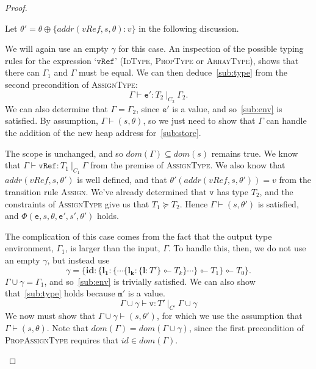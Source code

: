 \documentclass[12pt,a4paper,twoside,openright]{report}
\theoremstyle{definition}
\theoremstyle{dotless}
\newcommand*{\orig}{\ensuremath{\!\multimapinv\!}}
\begin{document}
\begin{proof}
\begin{case}[Assign]
	Let $\theta'=\theta\oplus\{addr(vRef,s,\theta):v\}$ in the following discussion.

	\begin{subcase}[AssignType]
	  We will again use an empty $\gamma$ for this case.
	  An inspection of the possible typing rules for the expression `$\mathtt{vRef}$'
	  (\textsc{IdType, PropType} or \textsc{ArrayType}), shows that there can
	  $\Gamma_1$ and $\Gamma$ must be equal.
	  We can then deduce~\eqref{sub:type} from the second precondition of \textsc{AssignType}:
	  $$\Gamma\vdash\mathtt{e'}:T_2\ |_{C_2}\ \Gamma_2.$$ 
	  We can also determine that $\Gamma=\Gamma_2$, since $\mathtt{e'}$ is a value, and
	  so~\eqref{sub:env} is satisfied. By assumption, $\Gamma\vdash(s,\theta)$, so
	   we just need to show that
	  $\Gamma$ can handle the addition of the new heap address for~\eqref{sub:store}.

 	  The scope is unchanged, and so $dom(\Gamma)\subseteq dom(s)$ remains true.
	  We know that $\Gamma\vdash\mathtt{vRef}:T_1\ |_{C_1}\ \Gamma$ from the premise of 
	  \textsc{AssignType}. We also know that $addr(vRef, s, \theta')$ is 
	  well defined, and that $\theta'(addr(vRef, s, \theta')) = v$ 
	  from the transition rule \textsc{Assign}. We've already determined
	  that $\mathtt{v}$ has type $T_2$, and the constraints of \textsc{AssignType}
	  give us that $T_1\succeq T_2$. Hence $\Gamma\vdash(s,\theta')$ is satisfied,
	  and $\Phi(\mathtt{e},s,\theta,\mathtt{e'},s',\theta')$ holds.
  	\end{subcase}

	\begin{subcase}[PropAssignType]
		The complication of this case comes from
		the fact that the output type environment, $\Gamma_1$, is larger than the input, $\Gamma$.
		To handle this, then, we do not use an empty $\gamma$, but instead use
		$$\gamma=\{\textbf{id}: \{ \mathbf{l_1}: \{\cdots \{\mathbf{l_k}:\{\mathbf{l}: T'\}\orig T_k \} \cdots\} \orig T_1\}\orig T_0\}.$$
		$\Gamma\!\cup\!\gamma=\Gamma_1$, and so~\eqref{sub:env} is trivially
		satisfied. We can also show that~\eqref{sub:type} holds because $\mathtt{m'}$ is a value.
		$$\Gamma\!\cup\!\gamma\vdash\mathtt{v}:T'\ |_{C'}\ \Gamma\!\cup\!\gamma$$
		We now must show that $\Gamma\!\cup\!\gamma\vdash(s,
		\theta')$, for which we use the assumption that
		$\Gamma\vdash(s,\theta)$. Note that
		$dom(\Gamma)=dom(\Gamma\!\cup\!\gamma)$, since the first precondition
		of \textsc{PropAssignType} requires that $id\in dom(\Gamma)$.


\end{subcase}
\end{case}
\end{proof}
\end{document}
